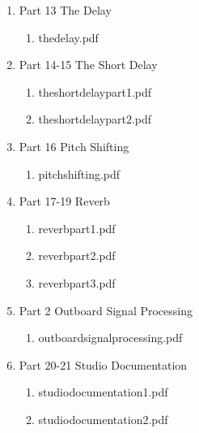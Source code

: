 \documentclass[11pt]{article}
\begin{document}
\begin{enumerate}
\begin{enumerate}
\item Part 13 The Delay
\label{sec-1-1-1-1-49-1-5-5-5}
\begin{enumerate}
\item thedelay.pdf
\label{sec-1-1-1-1-49-1-5-5-5-1}
\end{enumerate}

\item Part 14-15 The Short Delay
\label{sec-1-1-1-1-49-1-5-5-6}
\begin{enumerate}
\item theshortdelaypart1.pdf
\label{sec-1-1-1-1-49-1-5-5-6-1}

\item theshortdelaypart2.pdf
\label{sec-1-1-1-1-49-1-5-5-6-2}
\end{enumerate}

\item Part 16 Pitch Shifting
\label{sec-1-1-1-1-49-1-5-5-7}
\begin{enumerate}
\item pitchshifting.pdf
\label{sec-1-1-1-1-49-1-5-5-7-1}
\end{enumerate}

\item Part 17-19 Reverb
\label{sec-1-1-1-1-49-1-5-5-8}
\begin{enumerate}
\item reverbpart1.pdf
\label{sec-1-1-1-1-49-1-5-5-8-1}

\item reverbpart2.pdf
\label{sec-1-1-1-1-49-1-5-5-8-2}

\item reverbpart3.pdf
\label{sec-1-1-1-1-49-1-5-5-8-3}
\end{enumerate}

\item Part 2 Outboard Signal Processing
\label{sec-1-1-1-1-49-1-5-5-9}
\begin{enumerate}
\item outboardsignalprocessing.pdf
\label{sec-1-1-1-1-49-1-5-5-9-1}
\end{enumerate}

\item Part 20-21  Studio Documentation
\label{sec-1-1-1-1-49-1-5-5-10}
\begin{enumerate}
\item studiodocumentation1.pdf
\label{sec-1-1-1-1-49-1-5-5-10-1}

\item studiodocumentation2.pdf
\label{sec-1-1-1-1-49-1-5-5-10-2}
\end{enumerate}


\end{enumerate}
\end{enumerate}
\end{document}
